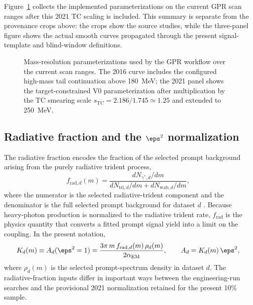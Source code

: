 Figure~\ref{fig:mass-resolution-three-panel} collects the implemented
parameterizations on the current GPR scan ranges after this 2021 TC scaling is
included. This summary is separate from the provenance crops above: the crops show the
source studies, while the three-panel figure shows the actual smooth curves propagated
through the present signal-template and blind-window definitions.

\begin{figure}[H]
\centering
{}
\caption{Mass-resolution parameterizations used by the GPR workflow over the current
scan ranges. The 2016 curve includes the configured high-mass tail continuation above
\SI{180}{MeV}; the 2021 panel shows the target-constrained V0 parameterization after
multiplication by the TC smearing scale $s_{\mathrm{TC}}=2.186/1.745\simeq1.25$ and
extended to \SI{250}{MeV}.}
\label{fig:mass-resolution-three-panel}
\end{figure}

\subsection{Radiative fraction and the \texorpdfstring{$\eps^2$}{epsilon2} normalization}
\label{sec:radfrac}

The radiative fraction encodes the fraction of the selected prompt background arising
from the purely radiative trident process,
\begin{equation}
f_{\mathrm{rad},d}(m)
=
\frac{dN_{\gamma^\ast,d}/dm}{dN_{\mathrm{tri},d}/dm + dN_{\mathrm{wab},d}/dm},
\label{eq:frad-def}
\end{equation}
where the numerator is the selected radiative-trident component and the denominator is
the full selected prompt background for dataset $d$
\cite{HPS2015DarkPhoton,HPS2016PromptLong}. Because heavy-photon production is
normalized to the radiative trident rate, $f_{\mathrm{rad}}$ is the physics quantity
that converts a fitted prompt signal yield into a limit on the coupling. In the
present notation,
\begin{equation}
K_d(m) \equiv A_d(\eps^2 = 1)
= \frac{3\pi\,m\,f_{\mathrm{rad},d}(m)\,\rho_d(m)}{2\alpha_{\mathrm{EM}}},
\qquad
A_d = K_d(m)\,\eps^2,
\label{eq:kd-radfrac}
\end{equation}
where $\rho_d(m)$ is the selected prompt-spectrum density in dataset $d$. The
radiative-fraction inputs differ in important ways between the engineering-run searches
and the provisional 2021 normalization retained for the present 10\% sample.

